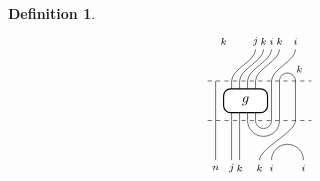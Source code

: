 \documentclass[11pt]{article}
\theoremstyle{plain}
\theoremstyle{definition}
\newtheorem{defn}[thm]{Definition}
\newcommand{\TLPlusPIso}[3]{
 \TLTStart
 \TLTThrough{#1}
 \TLTSnakeR{#2}{#3}
 \TLTEnd
}
\newcommand{\TLTCalcLabelOffset}[3][0cm]{
 \settowidth{#2}{\scriptsize{$#3$}}
 \setlength{#2}{.5#2}
 \setlength{#2}{\maxof{#2}{#1}}
}
\newcommand{\TLTEnd}{
 \draw[thick, rounded corners = 5pt] (0,0) rectangle ($ (TLTlead) + (0,.8) $);
 \end{tikzpicture}
}
\newcommand{\TLTStart}{
 \begin{tikzpicture}[baseline=.3cm]
 \coordinate (TLTlead) at (.2,0); %
 \let\TLTlabelwidth\relax
 \newlength{\TLTlabelwidth}
}
\newcommand{\TLTThrough}[1]{
 \TLTCalcLabelOffset[.2cm]{\TLTlabelwidth}{#1}
 \coordinate (TLTlead) at ($ (TLTlead) + ({\TLTlabelwidth},0) $);
 \begin{scope}[shift=(TLTlead)]
  \draw (0,0) -- (0,.8);
  \node at (0,1) {\scriptsize{$#1$}};
 \end{scope}
  \coordinate (TLTlead) at ($ (TLTlead) + ({\TLTlabelwidth},0) $);
}
\newcommand{\TLTSnakeR}[2]{
 \let\TLTscwidth\relax
 \newlength{\TLTscwidth}
 \let\TLTsswidth\relax
 \newlength{\TLTsswidth}
 \TLTCalcLabelOffset[.2cm]{\TLTscwidth}{#1}
 \TLTCalcLabelOffset[.5cm]{\TLTsswidth}{#2}
 \setlength{\TLTlabelwidth}{\TLTscwidth+\TLTsswidth}
 \setlength{\TLTlabelwidth}{\maxof{\TLTlabelwidth}{.7cm}} %
 \coordinate (TLTlead) at ($ (TLTlead) + ({\TLTscwidth},0) $);
 \begin{scope}[shift=(TLTlead)]
  \draw (.1,.8) arc (-180:0:.2cm);
  \draw (.1,0) .. controls ++(90:.3cm) and ++(270:.3cm) .. ($ (.1,.8) + ({\TLTlabelwidth},0) $);
  \draw ($ (.1,0) + ({\TLTsswidth},0) $) arc (180:0:.2cm);
  \node at (.1,1) {\scriptsize{$#1$}};
  \node at ($ (.1,1) + ({\TLTlabelwidth},0) $) {\scriptsize{$#2$}};
  \node at ($ (.1,-.2) + ({\TLTsswidth},0) $) {\scriptsize{$#1$}};
 \end{scope}
 \coordinate (TLTlead) at ($ (TLTlead) + ({\TLTlabelwidth+\TLTsswidth},0) $);
}
\begin{document}
\begin{defn}
\begin{align*}
\begin{tikzpicture}[baseline=.3cm]
\begin{scope}[shift={(0,1)}]
\begin{scope}[shift={(.1,0)}]
     \node at (.3,1) {\scriptsize{$k$}};
     \begin{scope}[shift={(.2,0)}] %
      \draw (.3,0)  .. controls ++(90:.3cm) and ++(270:.3cm) .. (.9,.8);
      \node at (.9,1) {\scriptsize{$j$}};
      \draw (.5,0)  .. controls ++(90:.3cm) and ++(270:.3cm) .. (1.1,.8);
      \node at (1.1,1) {\scriptsize{$k$}};
      \draw (.7,0)  .. controls ++(90:.3cm) and ++(270:.3cm) .. (1.3,.8);
      \node at (1.3,1) {\scriptsize{$i$}};
      \draw (.9,0)  .. controls ++(90:.3cm) and ++(270:.3cm) .. (1.5,.8);
      \node at (1.5,1) {\scriptsize{$k$}};
     \end{scope}
     \begin{scope}[shift={(.4,0)}] %
      \draw (1.1,0)  .. controls ++(90:.3cm) and ++(270:.3cm) .. (1.7,.8);
      \node at (1.7,1) {\scriptsize{$i$}};
      \draw (1.3,0) arc (180:0:.2cm);
      \node at (1.8,.3) {\scriptsize{$k$}};
     \end{scope}
    \end{scope}
    \draw[dashed] (0,0) -- (2.6,0);
   \end{scope}
   \draw (.2,0) -- (.2,1); %
   \draw (.6,0) -- (.6,1); %
   \draw (.8,0) -- (.8,1);
   \draw (1,0) -- (1,1);
   \draw (1.2,0) -- (1.2,1);
   \draw[thick, rounded corners = 5pt, fill=white] (.4,.2) rectangle (1.5,.8);
   \node at (.95,.5) {$g$};
   \draw (1.6,0) -- (1.6,1); %
   \draw (1.8,0) -- (1.8,1);
   \draw (2.2,0) -- (2.2,1);
   \draw[dashed] (0,0) -- (2.6,0);
   \begin{scope}[shift={(0,-1)}]
    \begin{scope}[shift={(.1,0)}]
     \draw (.1,0) -- (.1,1);
     \node at (.1,-0.2) {\scriptsize{$n$}};
     \begin{scope}[shift={(.2,0)}] %
      \draw (.3,0) -- (.3,1);
      \node at (.3,-0.2) {\scriptsize{$j$}};
      \draw (.5,0) -- (.5,1);
      \node at (.5,-0.2) {\scriptsize{$k$}};
      \draw (.7,1) arc (-180:0:.4cm); %
      \draw (.9,1) arc (-180:0:.2cm); %
      \draw (1,0)  .. controls ++(90:.3cm) and ++(270:.3cm) .. (1.9,1);
      \node at (1,-0.2) {\scriptsize{$k$}};
      \draw (1.3,0) arc (180:0:.4cm);
      \node at (1.3,-0.2) {\scriptsize{$i$}};
      \node at (2.1,-0.2) {\scriptsize{$i$}};

\end{scope}
\end{scope}
\end{scope}
\end{tikzpicture}
\end{align*}
\end{defn}
\end{document}

